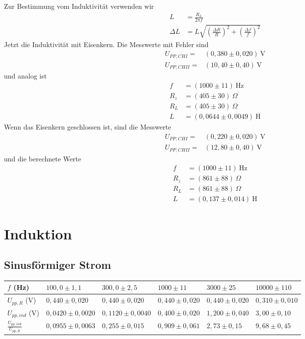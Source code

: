 \documentclass[prb,12pt]{revtex4-2}
\theoremstyle{definition}
\theoremstyle{definition}
\begin{document}
Zur Bestimmung vom Induktivität verwenden wir
\begin{align*}
	L&=\frac{R_L}{2\pi f}\\
	\Delta L&=L\sqrt{\left(\frac{\Delta R}{R}\right)^2 + \left(\frac{\Delta f}{f}\right)^2}
\end{align*}
Jetzt die Induktivität mit Eisenkern. Die Messwerte mit Fehler sind
\begin{align*}
	U_{PP, CHI} =& (0,380\pm 0,020)~\text{V}\\
	U_{PP, CHII} =& (10,40\pm 0,40)~\text{V}
\end{align*}
und analog ist
\begin{align*}
	f&=(1000\pm 11)~\text{Hz}\\
	R_z&=(405\pm 30)~\Omega\\
	R_L&= (405\pm 30)~\Omega\\
	L&= (0,0644\pm 0,0049)~\text{H}
\end{align*}
Wenn das Eisenkern geschlossen ist, sind die Messwerte
\begin{align*}
		U_{PP, CHI} =& (0,220\pm 0,020)~\text{V}\\
	U_{PP, CHII} =& (12,80\pm 0,40)~\text{V}
\end{align*}
und die berechnete Werte
\begin{align*}
	f&=(1000\pm 11)~\text{Hz}\\
R_z&=(861\pm 88)~\Omega\\
R_L&= (861\pm 88)~\Omega\\
L&= (0,137\pm 0,014)~\text{H}
\end{align*}
\section{Induktion}

\subsection{Sinusförmiger Strom}

\begin{center}
	\begin{tabularx}{\textwidth}{XXXXXX}
	\toprule
	$f$ (Hz) & $100,0\pm 1,1$ & $300,0\pm 2,5$ & $1000\pm 11$ & $3000\pm 25$ & $10000\pm 110$\\\midrule
	$U_{pp,R}$ (V) & $0,440\pm 0,020$ & $0,440\pm 0,020$ & $0,440\pm 0,020$ & $0,440\pm 0,020$ & $0,310\pm 0,010$\\\midrule
	$U_{pp,ind}$ (V) & $0,0420\pm 0,0020$ & $0,1120\pm 0,0040$ & $0,400\pm 0,020$ & $1,200\pm 0,040$ & $3,00\pm 0,10$\\\midrule
	$\frac{U_{pp,ind}}{U_{pp,R}}$ & $0,0955\pm 0,0063$ & $0,255\pm 0,015$ & $0,909\pm 0,061$ & $2,73\pm 0,15$ & $9,68\pm 0,45$\\\bottomrule
\end{tabularx}
\end{center}
\end{document}
